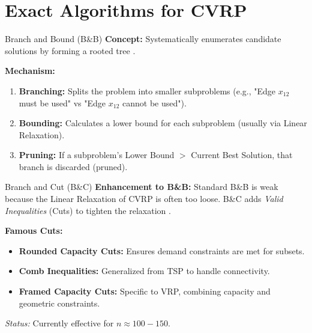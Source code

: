 \documentclass{beamer}
\begin{document}
\section{Exact Algorithms for CVRP}

\begin{frame}{Branch and Bound (B\&B)}
    \textbf{Concept:} 
    Systematically enumerates candidate solutions by forming a rooted tree \cite{laporte1983branch}.
    
    \textbf{Mechanism:}
    \begin{enumerate}
        \item \textbf{Branching:} Splits the problem into smaller subproblems (e.g., "Edge $x_{12}$ must be used" vs "Edge $x_{12}$ cannot be used").
        \item \textbf{Bounding:} Calculates a lower bound for each subproblem (usually via Linear Relaxation).
        \item \textbf{Pruning:} If a subproblem's Lower Bound $>$ Current Best Solution, that branch is discarded (pruned).
    \end{enumerate}
\end{frame}

\begin{frame}{Branch and Cut (B\&C)}
    \textbf{Enhancement to B\&B:}
    Standard B\&B is weak because the Linear Relaxation of CVRP is often too loose. B\&C adds \textit{Valid Inequalities} (Cuts) to tighten the relaxation \cite{augerat1995computational}.
    
    \textbf{Famous Cuts:}
    \begin{itemize}
        \item \textbf{Rounded Capacity Cuts:} Ensures demand constraints are met for subsets.
        \item \textbf{Comb Inequalities:} Generalized from TSP to handle connectivity.
        \item \textbf{Framed Capacity Cuts:} Specific to VRP, combining capacity and geometric constraints.
    \end{itemize}
    \textit{Status:} Currently effective for $n \approx 100-150$.
\end{frame}
\end{document}
